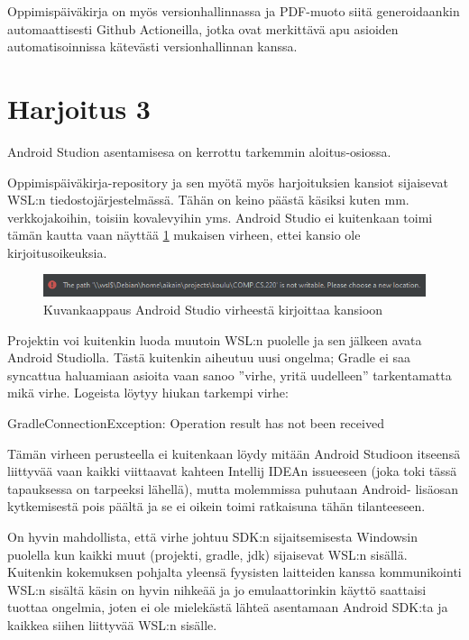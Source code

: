 Oppimispäiväkirja on myös versionhallinnassa ja PDF-muoto siitä generoidaankin
automaattisesti Github Actioneilla, jotka ovat merkittävä apu asioiden
automatisoinnissa kätevästi versionhallinnan kanssa.

\section{Harjoitus 3}

Android Studion asentamisesa on kerrottu tarkemmin aloitus-osiossa.

Oppimispäiväkirja-repository ja sen myötä myös harjoituksien kansiot
sijaisevat WSL:n tiedostojärjestelmässä. Tähän on keino päästä käsiksi kuten
mm. verkkojakoihin, toisiin kovalevyihin yms. Android Studio ei kuitenkaan
toimi tämän kautta vaan näyttää \ref{fig:android-studio-path-not-writable}
mukaisen virheen, ettei kansio ole kirjoitusoikeuksia.

\begin{figure}[h!]
    \includegraphics[width=\textwidth]{figures/android-studio-path-not-writable.png}
    \caption{Kuvankaappaus Android Studio virheestä kirjoittaa kansioon}
    \label{fig:android-studio-path-not-writable}
\end{figure}

Projektin voi kuitenkin luoda muutoin WSL:n puolelle ja sen jälkeen avata
Android Studiolla. Tästä kuitenkin aiheutuu uusi ongelma; Gradle ei saa
syncattua haluamiaan asioita vaan sanoo ''virhe, yritä uudelleen'' tarkentamatta
mikä virhe. Logeista löytyy hiukan tarkempi virhe:

\begin{displayquote}
GradleConnectionException: Operation result has not been received
\end{displayquote}

Tämän virheen perusteella ei kuitenkaan löydy mitään Android Studioon itseensä
liittyvää vaan kaikki viittaavat kahteen Intellij IDEAn issueeseen (joka toki
tässä tapauksessa on tarpeeksi lähellä), mutta molemmissa puhutaan Android-
lisäosan kytkemisestä pois päältä ja se ei oikein toimi ratkaisuna tähän
tilanteeseen.

On hyvin mahdollista, että virhe johtuu SDK:n sijaitsemisesta Windowsin
puolella kun kaikki muut (projekti, gradle, jdk) sijaisevat WSL:n sisällä.
Kuitenkin kokemuksen pohjalta yleensä fyysisten laitteiden kanssa kommunikointi
WSL:n sisältä käsin on hyvin nihkeää ja jo emulaattorinkin käyttö saattaisi
tuottaa ongelmia, joten ei ole mielekästä lähteä asentamaan Android SDK:ta ja
kaikkea siihen liittyvää WSL:n sisälle.

